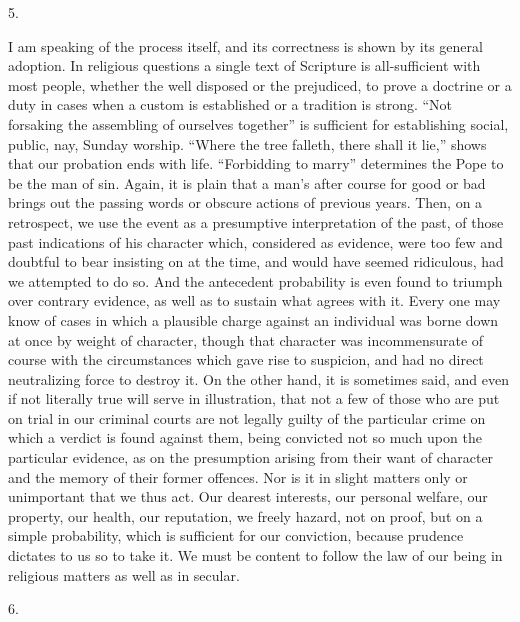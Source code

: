 5.

I am speaking of the process itself, and its
correctness is shown by its general adoption. In
religious questions a single text of Scripture is
all-sufficient with most people, whether the well
disposed or the prejudiced, to prove a doctrine or a duty
in cases when a custom is established or a tradition is
strong. ``Not forsaking the assembling of ourselves
together'' is sufficient for establishing social,
public, nay, Sunday worship. ``Where the tree
falleth, there shall it lie,'' shows that our
probation ends with life. ``Forbidding to marry''
determines the Pope to be the man of sin. Again, it is
plain that a man's after course for good or bad brings
out the passing words or obscure actions of previous
years. Then, on a retrospect, we use the event as a
presumptive interpretation of the past, of those past
indications of his character which, considered as
evidence, were too few and doubtful to bear insisting on
at the time, and would have seemed ridiculous, had we
attempted to do so. And the antecedent probability is
even found to triumph over contrary evidence, as well as
to sustain what agrees with it. Every one may know of
cases in which a plausible charge against an individual
was borne down at once by weight of character, though
that character was incommensurate of course with the
circumstances which gave rise to suspicion, and had no
direct neutralizing force to destroy it. On the other
hand, it is sometimes said, and even if not literally
true will serve in illustration, that not a few of those
who are put on trial in our criminal courts are not
legally guilty of the particular crime on which a verdict
is found against them, being convicted not so much upon
the particular evidence, as on the presumption arising
from their want of character and the memory of their
former offences. Nor is it in slight matters only or
unimportant that we thus act. Our dearest interests, our
personal welfare, our property, our health, our
reputation, we freely hazard, not on proof, but on a
simple probability, which is sufficient for our
conviction, because prudence dictates to us so to take
it. We must be content to follow the law of our being in
religious matters as well as in secular.

6.

